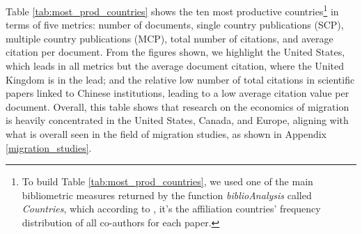 Table \ref{tab:most_prod_countries} shows the ten most productive countries\footnote{To build Table \ref{tab:most_prod_countries}, we used one of the main bibliometric measures returned by the function \textit{biblioAnalysis} called \textit{Countries}, which according to \cite{aria_bibliometrix_2017}, it's the affiliation countries’ frequency distribution of all co-authors for each paper.} in terms of five metrics: number of documents, single country publications (SCP), multiple country publications (MCP), total number of citations, and average citation per document. From the figures shown, we highlight the United States, which leads in all metrics but the average document citation, where the United Kingdom is in the lead; and the relative low number of total citations in scientific papers linked to Chinese institutions, leading to a low average citation value per document. Overall, this table shows that research on the economics of migration is heavily concentrated in the United States, Canada, and Europe, aligning with what is overall seen in the field of migration studies, as shown in Appendix \ref{migration_studies}.

